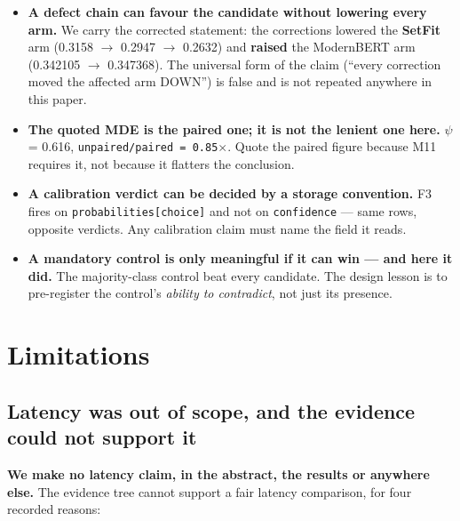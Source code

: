 \documentclass[11pt,a4paper]{article}
\begin{document}
\begin{itemize}
\item \textbf{A defect chain can favour the candidate without lowering every arm.} We carry the corrected statement: the corrections lowered the \textbf{SetFit} arm (0.3158 $\to$ 0.2947 $\to$ 0.2632) and \textbf{raised} the ModernBERT arm (0.342105 $\to$ 0.347368). The universal form of the claim (``every correction moved the affected arm DOWN'') is false and is not repeated anywhere in this paper.
\item \textbf{The quoted MDE is the paired one; it is not the lenient one here.} $\psi$ = 0.616, \texttt{unpaired/paired = 0.85$\times$}. Quote the paired figure because M11 requires it, not because it flatters the conclusion.
\item \textbf{A calibration verdict can be decided by a storage convention.} F3 fires on \texttt{probabilities[choice]} and not on \texttt{confidence} --- same rows, opposite verdicts. Any calibration claim must name the field it reads.
\item \textbf{A mandatory control is only meaningful if it can win --- and here it did.} The majority-class control beat every candidate. The design lesson is to pre-register the control's \emph{ability to contradict}, not just its presence.
\end{itemize}

\section{Limitations}

\subsection{Latency was out of scope, and the evidence could not support it}

\textbf{We make no latency claim, in the abstract, the results or anywhere else.} The evidence tree cannot support a fair latency comparison, for four recorded reasons:
\end{document}
